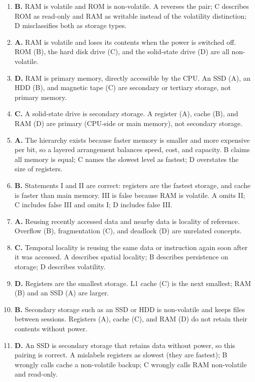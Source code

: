 \begin{enumerate}[label=\textbf{Q\arabic*.}, leftmargin=*]
  being faster than main memory (D) are all true.
\item \textbf{B.} RAM is volatile and ROM is non-volatile. A reverses the
  pair; C describes ROM as read-only and RAM as writable instead of the
  volatility distinction; D misclassifies both as storage types.
\item \textbf{A.} RAM is volatile and loses its contents when the power is
  switched off. ROM (B), the hard disk drive (C), and the solid-state drive
  (D) are all non-volatile.
\item \textbf{D.} RAM is primary memory, directly accessible by the CPU. An
  SSD (A), an HDD (B), and magnetic tape (C) are secondary or tertiary
  storage, not primary memory.
\item \textbf{C.} A solid-state drive is secondary storage. A register (A),
  cache (B), and RAM (D) are primary (CPU-side or main memory), not
  secondary storage.
\item \textbf{A.} The hierarchy exists because faster memory is smaller and
  more expensive per bit, so a layered arrangement balances speed, cost, and
  capacity. B claims all memory is equal; C names the slowest level as
  fastest; D overstates the size of registers.
\item \textbf{B.} Statements I and II are correct: registers are the fastest
  storage, and cache is faster than main memory. III is false because RAM is
  volatile. A omits II; C includes false III and omits I; D includes false
  III.
\item \textbf{A.} Reusing recently accessed data and nearby data is locality
  of reference. Overflow (B), fragmentation (C), and deadlock (D) are
  unrelated concepts.
\item \textbf{C.} Temporal locality is reusing the same data or instruction
  again soon after it was accessed. A describes spatial locality; B describes
  persistence on storage; D describes volatility.
\item \textbf{D.} Registers are the smallest storage. L1 cache (C) is the
  next smallest; RAM (B) and an SSD (A) are larger.
\item \textbf{B.} Secondary storage such as an SSD or HDD is non-volatile
  and keeps files between sessions. Registers (A), cache (C), and RAM (D) do
  not retain their contents without power.
\item \textbf{D.} An SSD is secondary storage that retains data without
  power, so this pairing is correct. A mislabels registers as slowest (they
  are fastest); B wrongly calls cache a non-volatile backup; C wrongly calls
  RAM non-volatile and read-only.


\end{enumerate}

